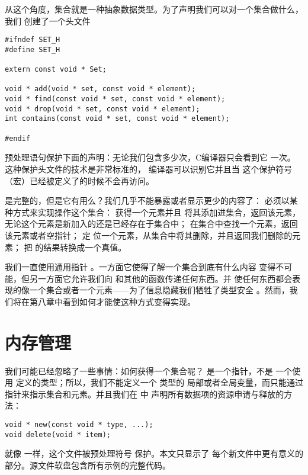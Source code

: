 从这个角度，集合就是一种抽象数据类型。为了声明我们可以对一个集合做什么，我们
创建了一个头文件
\begin{lstlisting}
#ifndef SET_H
#define SET_H

extern const void * Set;

void * add(void * set, const void * element);
void * find(const void * set, const void * element);
void * drop(void * set, const void * element);
int contains(const void * set, const void * element);

#endif
\end{lstlisting}

预处理语句保护下面的声明：无论我们包含多少次，C编译器只会看到它
一次。这种保护头文件的技术是非常标准的， 编译器可以识别它并且当
这个保护符号（宏）已经被定义了的时候不会再访问。

 是完整的，但是它有用么？我们几乎不能暴露或者显示更少的内容了：
 必须以某种方式来实现操作这个集合： 获得一个元素并且
将其添加进集合，返回该元素，无论这个元素是新加入的还是已经存在于集合中；
 在集合中查找一个元素，返回该元素或者空指针； 定
位一个元素，从集合中将其删除，并且返回我们删除的元素； 把
 的结果转换成一个真值。

我们一直使用通用指针 。一方面它使得了解一个集合到底有什么内容
变得不可能，但另一方面它允许我们向 和其他的函数传递任何东西。并
使任何东西都会表现的像一个集合或者一个元素——为了信息隐藏我们牺牲了类型安全
。然而，我们将在第八章中看到如何才能使这种方式变得实现。

\section{内存管理}
我们可能已经忽略了一些事情：如何获得一个集合呢？ 是一个指针，不是
一个使用  定义的类型；所以，我们不能定义一个 类型的
局部或者全局变量，而只能通过指针来指示集合和元素。并且我们在 中
声明所有数据项的资源申请与释放的方法：
\begin{lstlisting}
void * new(const void * type, ...);
void delete(void * item);
\end{lstlisting}
就像 一样，这个文件被预处理符号 保护。本文只显示了
每个新文件中更有意义的部分。源文件软盘包含所有示例的完整代码。

